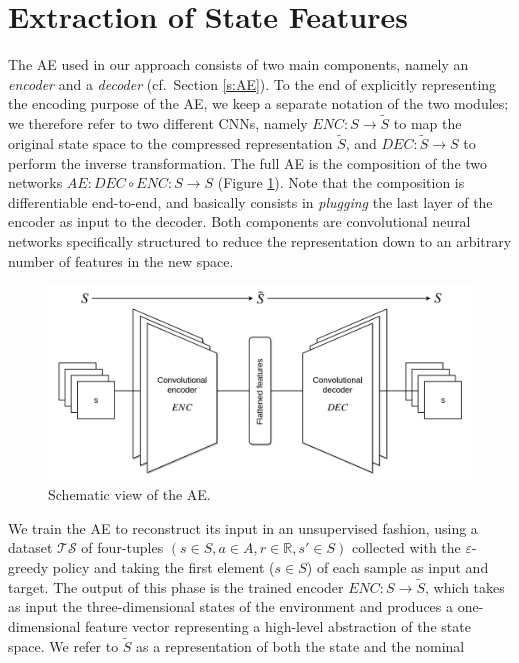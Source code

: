 \section{Extraction of State Features}
The AE used in our approach consists of two main components, namely an 
\textit{encoder} and a \textit{decoder} (cf.\ Section \ref{s:AE}). To the end of 
explicitly representing the encoding purpose of the AE, we keep a separate 
notation of the two modules; we therefore refer to two different CNNs, namely 
$ENC: S \rightarrow \tilde{S}$ to map the original state space to the 
compressed representation $\tilde{S}$, and $DEC: \tilde{S} \rightarrow S$ 
to perform the inverse transformation. The full AE is the composition of the
two networks $AE: DEC \circ ENC: S \rightarrow S$ (Figure \ref{f:ae}). 
Note that the composition is differentiable end-to-end, and basically consists 
in \textit{plugging} the last layer of the encoder as input to the decoder. 
Both components are convolutional neural networks specifically structured to 
reduce the representation down to an arbitrary number of features in the new 
space.
%
\begin{figure}
    \includegraphics[width=\textwidth]{pictures/conv_autoencoder}
    \centering
    \caption[Schematic view of the AE]{Schematic view of the AE.}
    \label{f:ae}
\end{figure}
%
We train the AE to reconstruct its input in an unsupervised fashion, using a
dataset $\mathcal{TS}$ of four-tuples $(s \in S, a \in A, r \in \mathbb{R}, s' \in S)$ 
collected with the $\varepsilon$-greedy policy and taking the first element ($s \in S$) 
of each sample as input and target. 
The output of this phase is the trained encoder $ENC: S \rightarrow \tilde{S}$, 
which takes as input the three-dimensional states of the environment and 
produces a one-dimensional feature vector representing a high-level abstraction 
of the state space.
We refer to $\tilde{S}$ as a representation of both the state and the nominal 
